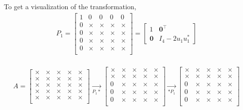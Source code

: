 To get a visualization of the transformation,
\begin{align}  
    P_1 = \begin{bmatrix}
        1 & 0 & 0 & 0 & 0 \\
        0 & \times & \times& \times& \times\\
        0 & \times & \times& \times& \times\\
        0 & \times & \times& \times& \times\\
        0 & \times & \times& \times& \times\\
    \end{bmatrix} = \begin{bmatrix}
        1 & \textbf{0}^{\top}\\
        \textbf{0} & I_4 - 2u_1u_1^*
    \end{bmatrix}    
\end{align}
\\
\begin{align}
    A = \begin{bmatrix}
        \times & \times & \times& \times& \times\\
        \times & \times & \times& \times& \times\\
        \times & \times & \times& \times& \times\\
        \times & \times & \times& \times& \times\\
        \times & \times & \times& \times& \times\\
    \end{bmatrix} \xrightarrow[P_1*]{} \begin{bmatrix}
        \times & \times & \times& \times& \times\\
        \times & \times & \times& \times& \times\\
        0 & \times & \times& \times& \times\\
        0 & \times & \times& \times& \times\\
        0 & \times & \times& \times& \times\\
    \end{bmatrix} \xrightarrow[*P_1]{}  \begin{bmatrix}
        \times & \times & \times& \times& \times\\
        \times & \times & \times& \times& \times\\
        0 & \times & \times& \times& \times\\
        0 & \times & \times& \times& \times\\
        0 & \times & \times& \times& \times\\
    \end{bmatrix}
\end{align}
